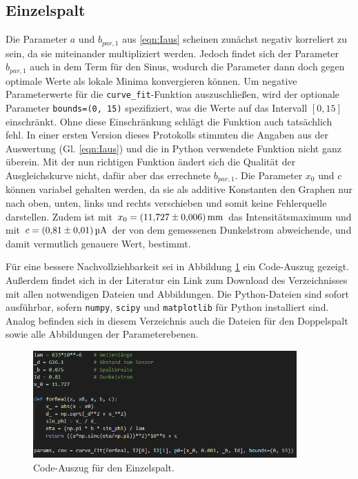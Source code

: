 \subsection{Einzelspalt}
Die Parameter $a$ und $b_{par, 1}$ aus \eqref{eqn:Iaus} scheinen zunächst negativ korreliert zu sein, da sie miteinander multipliziert werden. Jedoch findet sich der Parameter $b_{par, 1}$
auch in dem Term für den Sinus, wodurch die Parameter dann doch gegen optimale Werte als lokale Minima konvergieren können. Um negative Parameterwerte für die \texttt{curve\_fit}-Funktion auszuschließen, wird der optionale Parameter \texttt{bounds=(0, 15)} spezifiziert,
was die Werte auf das Intervall $[0, 15]$ einschränkt. Ohne diese Einschränkung schlägt die Funktion auch tatsächlich fehl.
In einer ersten Version dieses Protokolls stimmten die Angaben aus der Auswertung (Gl. \eqref{eqn:Iaus}) und die in Python verwendete Funktion nicht ganz überein.
Mit der nun richtigen Funktion ändert sich die Qualität der Ausgleichskurve nicht, dafür aber das errechnete $b_{par, 1}$.
Die Parameter $x_0$ und $c$ können variabel gehalten werden, da sie als additive Konstanten den Graphen nur nach oben, unten, links und rechts verschieben und somit keine
Fehlerquelle darstellen. Zudem ist mit $x_0 = \SI{11.727 \pm 0.006}{\milli\meter}$ das Intensitätsmaximum und mit $c = \SI{0.81\pm0.01}{\micro\ampere}$ der von dem gemessenen Dunkelstrom abweichende,
und damit vermutlich genauere Wert, bestimmt.

Für eine bessere Nachvollziehbarkeit sei in Abbildung \ref{fig:screen1} ein Code-Auszug gezeigt. Außerdem findet sich in der Literatur\cite{download} ein Link zum Download des Verzeichnisses mit allen notwendigen Dateien und Abbildungen.
Die Python-Dateien sind sofort ausführbar, sofern \texttt{numpy}, \texttt{scipy} und \texttt{matplotlib} für Python installiert sind. \\
Analog befinden sich in diesem Verzeichnis auch die Dateien für den Doppelspalt sowie alle Abbildungen der Parameterebenen.

\begin{figure}
    \centering
    \includegraphics[width=0.9\textwidth]{plots/screen1.png}
    \caption{Code-Auszug für den Einzelspalt.}
    \label{fig:screen1}
\end{figure}


